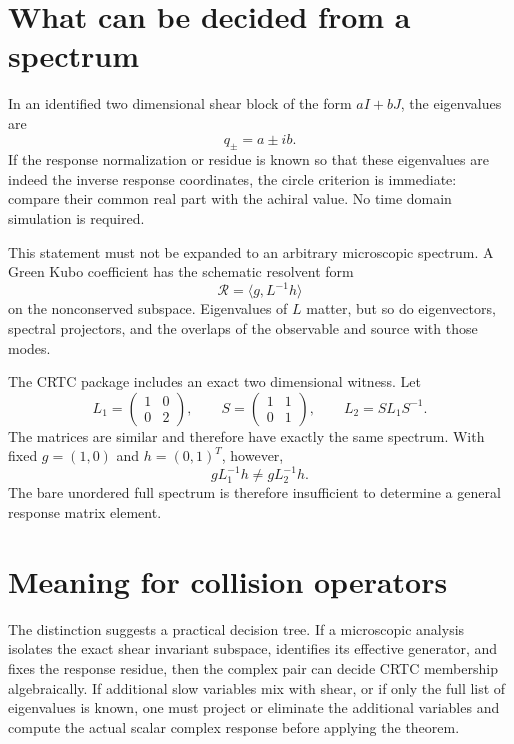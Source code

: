 \section{What can be decided from a spectrum}
In an identified two dimensional shear block of the form $aI+bJ$, the eigenvalues are
\begin{equation}
 q_\pm=a\pm ib.
 \label{eq:shear_spectrum}
\end{equation}
If the response normalization or residue is known so that these eigenvalues are indeed the inverse response coordinates, the circle criterion is immediate: compare their common real part with the achiral value. No time domain simulation is required.

This statement must not be expanded to an arbitrary microscopic spectrum. A Green Kubo coefficient has the schematic resolvent form
\begin{equation}
 \mathcal{R}=\langle g,L^{-1}h\rangle
 \label{eq:resolvent_matrix_element}
\end{equation}
on the nonconserved subspace. Eigenvalues of $L$ matter, but so do eigenvectors, spectral projectors, and the overlaps of the observable and source with those modes.

The CRTC package includes an exact two dimensional witness. Let
\begin{equation}
 L_1=\begin{pmatrix}1&0\\0&2\end{pmatrix},
 \qquad
 S=\begin{pmatrix}1&1\\0&1\end{pmatrix},
 \qquad
 L_2=S L_1S^{-1}.
 \label{eq:same_spectrum_matrices}
\end{equation}
The matrices are similar and therefore have exactly the same spectrum. With fixed $g=(1,0)$ and $h=(0,1)^T$, however,
\begin{equation}
 gL_1^{-1}h\ne gL_2^{-1}h.
 \label{eq:different_overlap}
\end{equation}
The bare unordered full spectrum is therefore insufficient to determine a general response matrix element.

\section{Meaning for collision operators}
The distinction suggests a practical decision tree. If a microscopic analysis isolates the exact shear invariant subspace, identifies its effective generator, and fixes the response residue, then the complex pair can decide CRTC membership algebraically. If additional slow variables mix with shear, or if only the full list of eigenvalues is known, one must project or eliminate the additional variables and compute the actual scalar complex response before applying the theorem.

